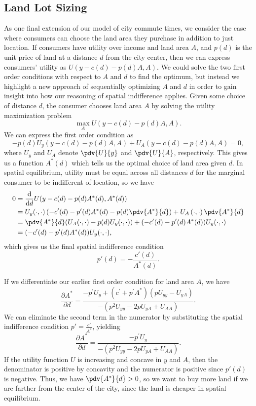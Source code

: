 \subsection*{Land Lot Sizing} 
As one final extension of our model of city commute times, we consider the case where consumers can choose the land area they purchase in addition to just location. If consumers have utility over income and land area $A$, and $p(d)$ is the unit price of land at a distance $d$ from the city center, then we can express consumers' utility as $U(y-c(d)-p(d)A, A).$ We could solve the two first order conditions with respect to $A$ and $d$ to find the optimum, but instead we highlight a new approach of sequentially optimizing $A$ and $d$ in order to gain insight into how our reasoning of spatial indifference applies. Given some choice of distance $d$, the consumer chooses land area $A$ by solving the utility maximization problem 
$$\max_{A}U(y-c(d)-p(d)A, A).$$
We can express the first order condition as 
$$-p(d)U_y(y-c(d)-p(d)A, A) + U_A(y-c(d)-p(d)A, A) = 0,$$
where $U_y$ and $U_A$ denote $\pdv{U}{y}$ and $\pdv{U}{A}$, respectively. This gives us a function $A^*(d)$ which tells us the optimal choice of land area given $d$. In spatial equilibrium, utility must be equal across all distances $d$ for the marginal consumer to be indifferent of location, so we have
\begin{align*}
    0 &= \frac{\text{d}}{\text{d}d} U(y - c(d) - p(d)A^*(d), A^*(d)) \\
    &= U_y(\cdot, \cdot)\left(-c'(d)-p'(d)A^*(d) - p(d)\pdv{A^*}{d}\right) + U_A\left(\cdot, \cdot\right)\pdv{A^*}{d} \\
    &= \pdv{A^*}{d}(U_A(\cdot, \cdot) - p(d)U_y(\cdot, \cdot)) + (-c'(d)-p'(d)A^*(d))U_y(\cdot, \cdot) \\
    &= (-c'(d)-p'(d)A^*(d))U_y(\cdot, \cdot),
\end{align*}
which gives us the final spatial indifference condition
$$p'(d) = -\frac{c'(d)}{A^*(d)}.$$

If we differentiate our earlier first order condition for land area $A$, we have
$$\frac{\partial A^{*}}{\partial d}=\frac{-p^{\prime} U_{y}+\left(c^{\prime}+p^{\prime} A^{*}\right)\left(p U_{yy}-U_{yA}\right)}{-\left(p^{2} U_{yy}-2 p U_{yA}+U_{AA}\right)}.$$
We can eliminate the second term in the numerator by substituting the spatial indifference condition $p' = \frac{c'}{A^*}$, yielding
$$\frac{\partial A^{*}}{\partial d}=\frac{-p^{\prime} U_{y}}{-\left(p^{2} U_{yy}-2 p U_{yA}+U_{AA}\right)}.$$
If the utility function $U$ is increasing and concave in $y$ and $A$, then the denominator is positive by concavity and the numerator is positive since $p'(d)$ is negative. Thus, we have $\pdv{A^*}{d} > 0$, so we want to buy more land if we are farther from the center of the city, since the land is cheaper in spatial equilibrium. 

